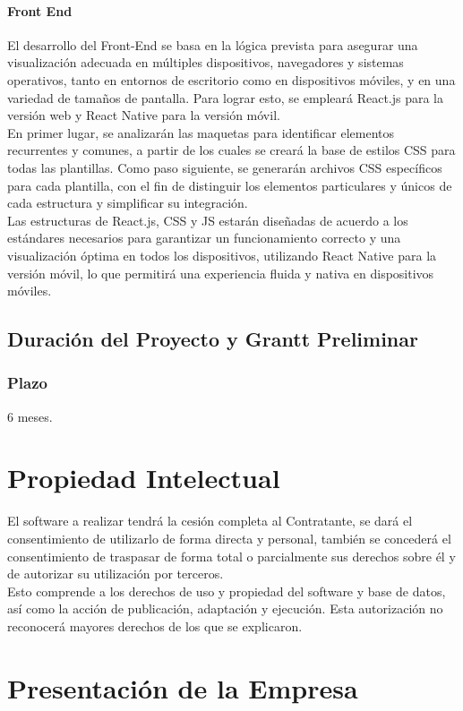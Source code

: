 \documentclass{report}
\begin{document}
					\subsubsection{Front End}	
					El desarrollo del Front-End se basa en la lógica prevista para asegurar una visualización adecuada en múltiples dispositivos, navegadores y sistemas operativos, tanto en entornos de escritorio como en dispositivos móviles, y en una variedad de tamaños de pantalla. Para lograr esto, se empleará React.js para la versión web y React Native para la versión móvil.\\
					\break
					En primer lugar, se analizarán las maquetas para identificar elementos recurrentes y comunes, a partir de los cuales se creará la base de estilos CSS para todas las plantillas. Como paso siguiente, se generarán archivos CSS específicos para cada plantilla, con el fin de distinguir los elementos particulares y únicos de cada estructura y simplificar su integración.\\
					\break
					Las estructuras de React.js, CSS y JS estarán diseñadas de acuerdo a los estándares necesarios para garantizar un funcionamiento correcto y una visualización óptima en todos los dispositivos, utilizando React Native para la versión móvil, lo que permitirá una experiencia fluida y nativa en dispositivos móviles.
		\section{Duración del Proyecto y Grantt Preliminar}	
			\subsection{Plazo}
				6 meses.
	
	\chapter{Propiedad Intelectual}
		El software a realizar tendrá la cesión completa al Contratante, se dará el consentimiento de utilizarlo de forma directa y personal, también se concederá el consentimiento de traspasar de forma total o parcialmente sus derechos sobre él y de autorizar su utilización por terceros.\\
		\break
		Esto comprende a los derechos de uso y propiedad del software y base de datos, así como la acción de publicación, adaptación y ejecución. Esta autorización no reconocerá mayores derechos de los que se explicaron.
		
	
	\chapter{Presentación de la Empresa}
\end{document}
